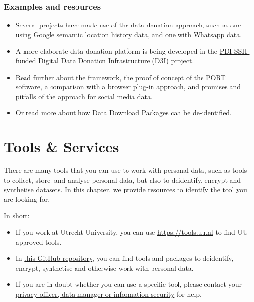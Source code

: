 \documentclass[
]{book}
\providecommand{\tightlist}{%
  \setlength{\itemsep}{0pt}\setlength{\parskip}{0pt}}
\begin{document}
\hypertarget{data-donation-resources}{%
\subsection{Examples and resources}\label{data-donation-resources}}

\begin{itemize}
\tightlist
\item
  Several projects have made use of the data donation approach, such as one
  using \href{https://github.com/UtrechtUniversity/google-semantic-location-history}{Google semantic location history data},
  and one with \href{https://github.com/sodascience/port-whatsapp-datadonation}{Whatsapp data}.
\item
  A more elaborate data donation platform is being developed in the
  \href{https://pdi-ssh.nl/en/2021/11/funded-projects-2021-call/}{PDI-SSH-funded}
  Digital Data Donation Infrastructure
  (\href{https://www.uu.nl/en/news/the-board-of-the-pdi-ssh-foundation-honours-applications-in-the-call-digital-infrastructure-ssh}{D3I})
  project.
\item
  Read further about the
  \href{https://doi.org/10.5117/CCR2022.2.002.BOES}{framework},
  the \href{https://doi.org/10.1016/j.patter.2022.100444}{proof of concept of the PORT software},
  a \href{https://doi.org/10.1080/1369118X.2022.2097015}{comparison with a browser plug-in} approach,
  and \href{https://doi.org/10.31219/osf.io/krqb9}{promises and pitfalls of the approach for social media data}.
\item
  Or read more about how Data Download Packages can be
  \href{https://doi.org/10.3233/DS-210035}{de-identified}.
\end{itemize}

\hypertarget{tools-and-services}{%
\chapter{Tools \& Services}\label{tools-and-services}}

There are many tools that you can use to work with personal data, such as tools
to collect, store, and analyse personal data, but also to deidentify, encrypt
and synthetise datasets. In this chapter, we provide resources to identify
the tool you are looking for.

In short:

\begin{itemize}
\tightlist
\item
  If you work at Utrecht University, you can use \url{https://tools.uu.nl} to find UU-approved tools.
\item
  In \href{https://github.com/UtrechtUniversity/privacy-engineering-tools/}{this GitHub repository},
  you can find tools and packages to deidentify, encrypt, synthetise and otherwise
  work with personal data.
\item
  If you are in doubt whether you can use a specific tool, please contact your
  \protect\hyperlink{support}{privacy officer, data manager or information security} for help.
\end{itemize}
\end{document}

